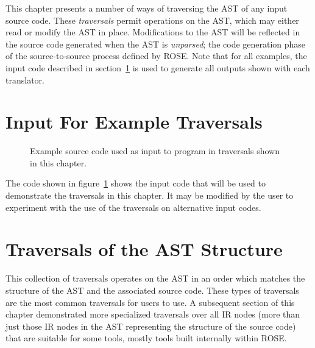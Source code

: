    This chapter presents a number of ways of traversing the AST
of any input source code.  These {\em traversals} permit operations
on the AST, which may either read or modify the AST in place.  Modifications
to the AST will be reflected in the source code generated when the AST is 
{\em unparsed}; the code generation phase of the source-to-source process
defined by ROSE.  Note that for all examples, the input code described in 
section~\ref{Tutorial:exampleInputCodeDescription} is used to generate
all outputs shown with each translator.


\section{Input For Example Traversals}
\label{Tutorial:exampleInputCodeDescription}

\begin{figure}[!h]
{\indent
{\mySmallFontSize

\begin{latexonly}
   
\end{latexonly}

\begin{htmlonly}
   
\end{htmlonly}

}
}
\caption{Example source code used as input to program in
         traversals shown in this chapter.}
\label{Tutorial:exampleInputCode_ExampleTraversals}
\end{figure}

   The code shown in figure~\ref{Tutorial:exampleInputCode_ExampleTraversals}
shows the input code that will be used to demonstrate the traversals in this 
chapter.  It may be modified by the user to experiment with the use of the traversals
on alternative input codes.


\section{Traversals of the AST Structure}
\label{Tutorial:astStructureTraversals}

    This collection of traversals operates on the AST in an order
which matches the structure of the AST and the associated source code.
These types of traversals are the most common traversals for users
to use.  A subsequent section of this chapter demonstrated more
specialized traversals over all IR nodes (more than just those IR nodes
in the AST representing the structure of the source code) that are 
suitable for some tools, mostly tools built internally within ROSE.

